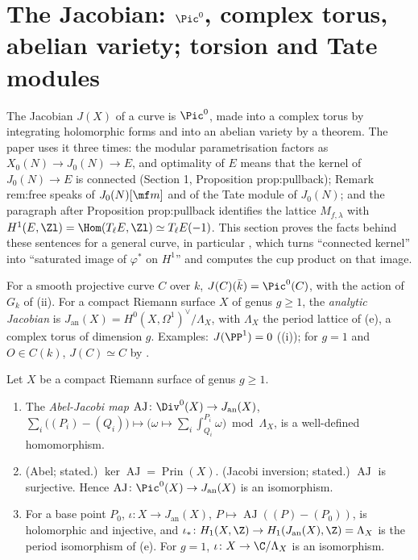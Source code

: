 \section[The Jacobian; torsion and Tate modules]{The Jacobian: \texorpdfstring{$\Pic^0$}{Pic0}, complex torus, abelian variety; torsion and Tate modules}\label{sec:curves:jacobian}

The Jacobian $J(X)$ of a curve is $\Pic^0$, made into a complex torus by integrating holomorphic forms and into an abelian variety by a theorem. The paper uses it
three times: the modular parametrisation factors as $X_0(N)\to J_0(N)\to E$, and optimality of $E$ means that the kernel of $J_0(N)\to E$ is connected (Section 1,
Proposition prop:pullback); Remark rem:free speaks of $J_0(N)[\mf m]$ and of the Tate module of $J_0(N)$; and the paragraph after Proposition prop:pullback identifies the
lattice $M_{f,\lambda}$ with $H^1(E,\Zl)=\Hom(T_\ell E,\Zl)\simeq T_\ell E(-1)$. This section proves the facts behind these sentences for a general curve, in particular
, which turns ``connected kernel'' into ``saturated image of $\varphi^*$ on $H^1$'' and computes the cup product on that image.

\begin{definition}\label{def:curves:jacobian}
For a smooth projective curve $C$ over $k$, $J(C)(\bar k)=\Pic^0(C)$, with the action of $G_k$ of (ii). For a compact Riemann surface $X$ of genus
$g\ge1$, the \emph{analytic Jacobian} is $J_{\mathrm{an}}(X)=H^0(X,\Omega^1)^\vee/\Lambda_X$, with $\Lambda_X$ the period lattice of (e), a complex torus of
dimension $g$. Examples: $J(\PP^1)=0$ ((i)); for $g=1$ and $O\in C(k)$, $J(C)\simeq C$ by .
\end{definition}

\begin{theorem}\label{thm:curves:abel-jacobi}
Let $X$ be a compact Riemann surface of genus $g\ge1$.
\begin{enumerate}[label=(\roman*)]
\item The \emph{Abel-Jacobi map} $\operatorname{AJ}\colon\Div^0(X)\to J_{\mathrm{an}}(X)$, $\sum_i\bigl((P_i)-(Q_i)\bigr)\mapsto\bigl(\omega\mapsto\sum_i\int_{Q_i}^{P_i}\omega\bigr)\bmod\Lambda_X$, is a well-defined
homomorphism.
\item (Abel; stated.) $\ker\operatorname{AJ}=\operatorname{Prin}(X)$. (Jacobi inversion; stated.) $\operatorname{AJ}$ is surjective. Hence $\operatorname{AJ}\colon\Pic^0(X)\to J_{\mathrm{an}}(X)$ is an
isomorphism.
\item For a base point $P_0$, $\iota\colon X\to J_{\mathrm{an}}(X)$, $P\mapsto\operatorname{AJ}((P)-(P_0))$, is holomorphic and injective, and $\iota_*\colon H_1(X,\Z)\to H_1(J_{\mathrm{an}}(X),\Z)=\Lambda_X$
is the period isomorphism of (e). For $g=1$, $\iota\colon X\to\C/\Lambda_X$ is an isomorphism.
\end{enumerate}
\end{theorem}

